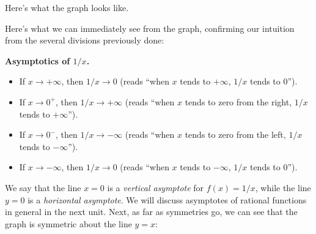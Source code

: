 \documentclass{ximera}
\begin{document}
Here's what the graph looks like.


\begin{image}
\end{image}





Here's what we can immediately see from the graph, confirming our intuition from the several divisions previously done:

\begin{callout}
  {\bf Asymptotics of $1/x$.}
  \begin{itemize}
  \item If $x \to +\infty$, then $1/x \to 0$ (reads ``when $x$ tends to $+\infty$, $1/x$ tends to $0$'').
  \item If $x \to 0^+$, then $1/x \to +\infty$ (reads ``when $x$ tends to zero from the right, $1/x$ tends to $+\infty$'').
  \item If $x \to 0^-$, then $1/x \to -\infty$ (reads ``when $x$ tends to zero from the left, $1/x$ tends to $-\infty$'').
  \item If $x \to -\infty$, then $1/x \to 0$ (reads ``when $x$ tends to $-\infty$, $1/x$ tends to $0$'').
  \end{itemize}
\end{callout}

We say that the line $x=0$ is a \emph{vertical asymptote} for $f(x) = 1/x$, while the line $y=0$ is a \emph{horizontal asymptote}. We will discuss asymptotes of rational functions in general in the next unit. Next, as far as symmetries go, we can see that the graph is symmetric about the line $y=x$:
\end{document}
